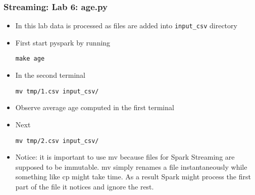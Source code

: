 \begin{frame}[fragile]
\frametitle{Streaming: Lab 6: age.py}
\begin{itemize}
\item In this lab data is processed as files are added into {\color{mycolorcli}\verb|input_csv|} directory
\item First start pyspark by running
{\color{mycolorcli}
\begin{verbatim}
make age
\end{verbatim}
}
\item In the second terminal 
{\color{mycolorcli}
\begin{verbatim}
mv tmp/1.csv input_csv/
\end{verbatim}
}
\item Observe average age computed in the first terminal
\item Next
{\color{mycolorcli}
\begin{verbatim}
mv tmp/2.csv input_csv/
\end{verbatim}
}
\item Notice: it is important to use {\color{mycolorcli}mv} because files for Spark Streaming are supposed to be immutable. {\color{mycolorcli}mv} simply renames a file instantaneously while 
something like {\color{mycolorcli}cp} might take time. As a result Spark might process the first part of the file it notices and ignore the rest.
\end{itemize}
\end{frame}

